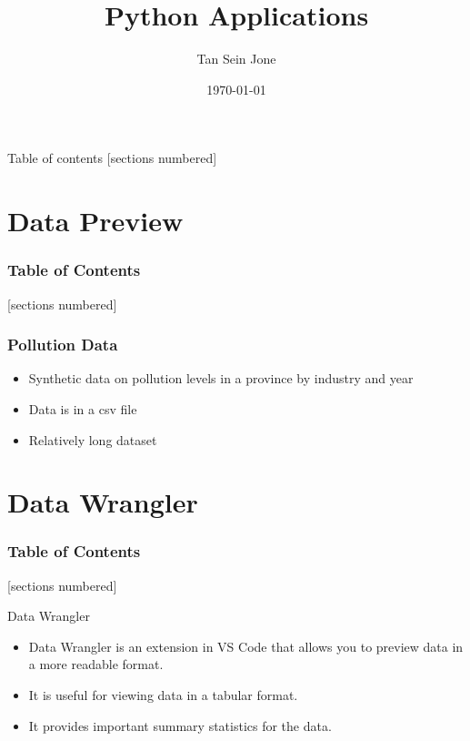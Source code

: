 \documentclass[serif, 9pt, aspectratio=32]{beamer}
\title{Python Applications}
\date{\today}
\author{Tan Sein Jone}
\institute{University of British Columbia}
\begin{document}
\maketitle

\begin{frame}{Table of contents}
    [sections numbered]
    \tableofcontents[hideallsubsections]
\end{frame}

\section{Data Preview}

\begin{frame}
    \frametitle{Table of Contents}
    [sections numbered]
    \tableofcontents[currentsection]
\end{frame}

\begin{frame}
    \centering
    \frametitle{Pollution Data}
    \begin{itemize}
        \setlength{\itemsep}{2em}
        \item Synthetic data on pollution levels in a province by industry and year
        \item Data is in a csv file
        \item Relatively long dataset
    \end{itemize}
\end{frame}

\section{Data Wrangler}

\begin{frame}
    \frametitle{Table of Contents}
    [sections numbered]
    \tableofcontents[currentsection]
\end{frame}

\begin{frame}{Data Wrangler}
    \begin{itemize}
        \setlength{\itemsep}{3em}
        \item Data Wrangler is an extension in VS Code that allows you to preview data in a more readable format.
        \item It is useful for viewing data in a tabular format.
        \item It provides important summary statistics for the data.
    \end{itemize}
\end{frame}
\end{document}
